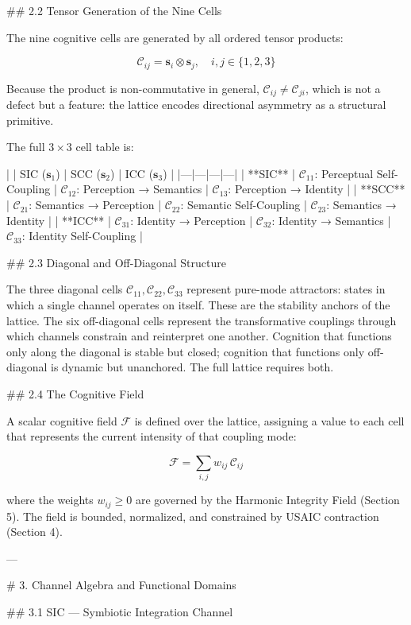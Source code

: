 ## 2.2 Tensor Generation of the Nine Cells

The nine cognitive cells are generated by all ordered tensor products:

\[
\mathcal{C}_{ij} = \mathbf{s}_i \otimes \mathbf{s}_j, \quad i,j \in \{1,2,3\}
\]

Because the product is non-commutative in general, \(\mathcal{C}_{ij} \neq
\mathcal{C}_{ji}\), which is not a defect but a feature: the lattice encodes
directional asymmetry as a structural primitive.

The full \(3 \times 3\) cell table is:

| | SIC (\(\mathbf{s}_1\)) | SCC (\(\mathbf{s}_2\)) | ICC (\(\mathbf{s}_3\)) |
|---|---|---|---|
| **SIC** | \(\mathcal{C}_{11}\): Perceptual Self-Coupling | \(\mathcal{C}_{12}\): Perception → Semantics | \(\mathcal{C}_{13}\): Perception → Identity |
| **SCC** | \(\mathcal{C}_{21}\): Semantics → Perception | \(\mathcal{C}_{22}\): Semantic Self-Coupling | \(\mathcal{C}_{23}\): Semantics → Identity |
| **ICC** | \(\mathcal{C}_{31}\): Identity → Perception | \(\mathcal{C}_{32}\): Identity → Semantics | \(\mathcal{C}_{33}\): Identity Self-Coupling |

## 2.3 Diagonal and Off-Diagonal Structure

The three diagonal cells \(\mathcal{C}_{11}, \mathcal{C}_{22}, \mathcal{C}_{33}\)
represent pure-mode attractors: states in which a single channel operates on itself.
These are the stability anchors of the lattice. The six off-diagonal cells represent
the transformative couplings through which channels constrain and reinterpret one
another. Cognition that functions only along the diagonal is stable but closed;
cognition that functions only off-diagonal is dynamic but unanchored. The full
lattice requires both.

## 2.4 The Cognitive Field

A scalar cognitive field \(\mathcal{F}\) is defined over the lattice, assigning a
value to each cell that represents the current intensity of that coupling mode:

\[
\mathcal{F} = \sum_{i,j} w_{ij}\, \mathcal{C}_{ij}
\]

where the weights \(w_{ij} \geq 0\) are governed by the Harmonic Integrity Field
(Section 5). The field is bounded, normalized, and constrained by USAIC contraction
(Section 4).

---

# 3. Channel Algebra and Functional Domains

## 3.1 SIC — Symbiotic Integration Channel

